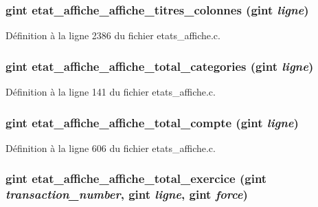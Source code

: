 \subsubsection[{etat\_\-affiche\_\-affiche\_\-titres\_\-colonnes}]{\setlength{\rightskip}{0pt plus 5cm}gint etat\_\-affiche\_\-affiche\_\-titres\_\-colonnes (gint {\em ligne})}\label{etats__affiche_8h_a5f5c4acce2b2b068699c0c0cf994ee42}


Définition à la ligne 2386 du fichier etats\_\-affiche.c.

\subsubsection[{etat\_\-affiche\_\-affiche\_\-total\_\-categories}]{\setlength{\rightskip}{0pt plus 5cm}gint etat\_\-affiche\_\-affiche\_\-total\_\-categories (gint {\em ligne})}\label{etats__affiche_8h_ad50f5b18eb520885a8b87346e8be3f0f}


Définition à la ligne 141 du fichier etats\_\-affiche.c.

\subsubsection[{etat\_\-affiche\_\-affiche\_\-total\_\-compte}]{\setlength{\rightskip}{0pt plus 5cm}gint etat\_\-affiche\_\-affiche\_\-total\_\-compte (gint {\em ligne})}\label{etats__affiche_8h_a66a960e46b7ba5b6b3d31b3b3450c343}


Définition à la ligne 606 du fichier etats\_\-affiche.c.

\subsubsection[{etat\_\-affiche\_\-affiche\_\-total\_\-exercice}]{\setlength{\rightskip}{0pt plus 5cm}gint etat\_\-affiche\_\-affiche\_\-total\_\-exercice (gint {\em transaction\_\-number}, \/  gint {\em ligne}, \/  gint {\em force})}\label{etats__affiche_8h_ac945a1899478f32291729b2a3d174cbf}


